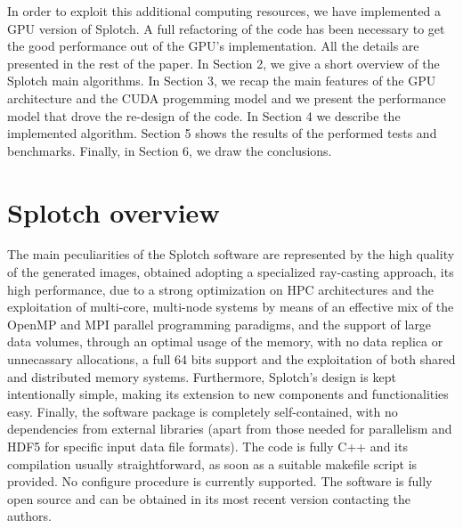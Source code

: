 \documentclass[11pt]{article}
\begin{document}
In order to exploit this additional computing resources, we have implemented 
a GPU version of Splotch. A full refactoring of the code has been necessary 
to get the good performance out of the GPU's implementation. 
All the details are presented in the rest of the paper. In Section 2, we give a short 
overview of the Splotch main algorithms. In Section 3, we recap the main features
of the GPU architecture and the CUDA progemming model
and we present the performance model that drove the 
re-design of the code. In Section 4 
we describe the implemented algorithm. Section 5 shows
the results of the performed tests and benchmarks. Finally, in Section 6, we draw 
the conclusions. 

\section{Splotch overview}
\label{sec:overview}

The main peculiarities of the Splotch software are represented by the 
high quality of the generated images, obtained adopting a specialized ray-casting 
approach, its high performance, due to a strong optimization on HPC architectures and the exploitation of multi-core, multi-node 
systems by means of an effective mix of the OpenMP and MPI parallel programming paradigms, and
the support of large data volumes, through an optimal usage of the memory, with
no data replica or unnecassary allocations, a full 64 bits support and the exploitation
of both shared and distributed memory systems. Furthermore, Splotch's design is kept 
intentionally simple, making its extension to new components and functionalities easy. 
Finally, the software package is completely self-contained, with no dependencies from external 
libraries (apart from those needed for parallelism and HDF5 \cite{hdf5}  for
specific input data file formats). The code is fully C++ and its compilation
usually straightforward, as soon as a suitable makefile script is provided.
No configure procedure is currently supported. The software is fully open source and 
can be obtained in its most recent version contacting the authors.
\end{document}
